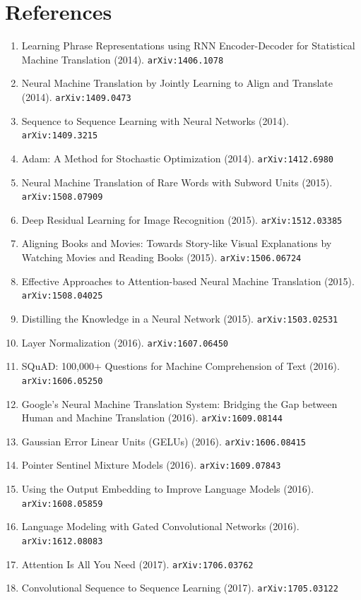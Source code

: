 \documentclass[11pt]{article}
\begin{document}
\section*{References}
\begin{enumerate}\small
  \item Learning Phrase Representations using RNN Encoder-Decoder for
  Statistical Machine Translation (2014). \texttt{arXiv:1406.1078}
  \item Neural Machine Translation by Jointly Learning to Align and Translate (2014). \texttt{arXiv:1409.0473}
  \item Sequence to Sequence Learning with Neural Networks (2014). \texttt{arXiv:1409.3215}
  \item Adam: A Method for Stochastic Optimization (2014). \texttt{arXiv:1412.6980}
  \item Neural Machine Translation of Rare Words with Subword Units (2015). \texttt{arXiv:1508.07909}
  \item Deep Residual Learning for Image Recognition (2015). \texttt{arXiv:1512.03385}
  \item Aligning Books and Movies: Towards Story-like Visual Explanations by
  Watching Movies and Reading Books (2015). \texttt{arXiv:1506.06724}
  \item Effective Approaches to Attention-based Neural Machine Translation (2015). \texttt{arXiv:1508.04025}
  \item Distilling the Knowledge in a Neural Network (2015). \texttt{arXiv:1503.02531}
  \item Layer Normalization (2016). \texttt{arXiv:1607.06450}
  \item SQuAD: 100,000+ Questions for Machine Comprehension of Text (2016). \texttt{arXiv:1606.05250}
  \item Google's Neural Machine Translation System: Bridging the Gap between
  Human and Machine Translation (2016). \texttt{arXiv:1609.08144}
  \item Gaussian Error Linear Units (GELUs) (2016). \texttt{arXiv:1606.08415}
  \item Pointer Sentinel Mixture Models (2016). \texttt{arXiv:1609.07843}
  \item Using the Output Embedding to Improve Language Models (2016). \texttt{arXiv:1608.05859}
  \item Language Modeling with Gated Convolutional Networks (2016). \texttt{arXiv:1612.08083}
  \item Attention Is All You Need (2017). \texttt{arXiv:1706.03762}
  \item Convolutional Sequence to Sequence Learning (2017). \texttt{arXiv:1705.03122}

\end{enumerate}
\end{document}
